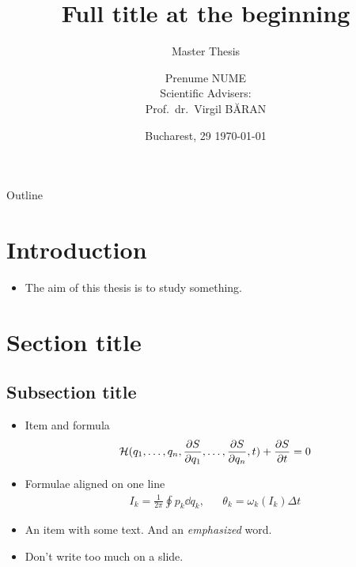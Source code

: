 \documentclass[a4,compress]{beamer}
\title[Title (appears on every slide)]{Full title at the beginning}
\subtitle{Master Thesis}
\author{
  Prenume NUME \\
   \hspace{6cm} {\small	Scientific Advisers:} \\
   \hspace{6.35cm} {\small Prof.~dr.~Virgil BĂRAN}
}
\institute[Universitatea din București]
{
  Universitatea din București \\
  Facultatea de Fizică
}
\date{\small Bucharest, 29 \printdayoff\today}
\theoremstyle{plain}
\theoremstyle{definition}
\begin{document}

\begin{frame}[plain]
 \titlepage
\end{frame}


\begin{frame}{Outline}
  \tableofcontents[]
\end{frame}

\section[Intro]{Introduction}


\begin{frame}
  \begin{itemize}
    \item The aim of this thesis is to study something.
  \end{itemize}
\end{frame}

\section[Short title]{Section title}

\subsection{Subsection title}


\begin{frame}
  \begin{itemize}
    \item Item and formula
    \begin{equation*}
      \label{eq:hamilton-jacobi-first}
      \mathcal{H}(q_1,\dotsc,q_n,\pdv{S}{q_1},\dotsc,\pdv{S}{q_n},t) + \pdv{S}{t} = 0
    \end{equation*}
    \item Formulae aligned on one line
    \begin{align*}
      I_k = \frac{1}{2\pi}\oint p_k \dd{q_k}, &&
      \theta_k = \omega_k(I_k) \Delta t
    \end{align*}
    \item An item with some text. And an \emph{emphasized} word.
    \item Don't write too much on a slide.
  \end{itemize}
\end{frame}
\end{document}
